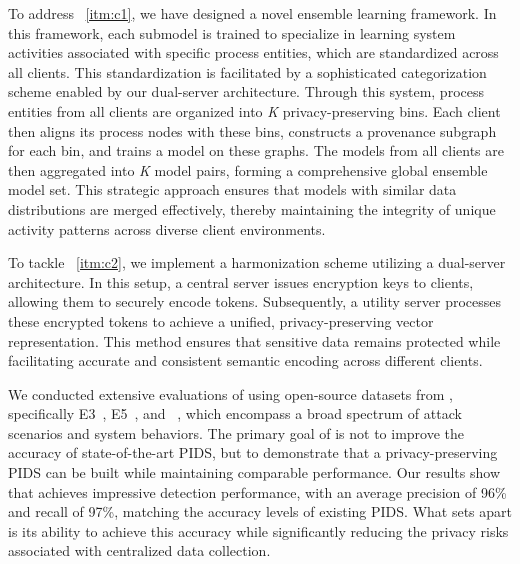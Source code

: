 To address ~\ref{itm:c1}, we have designed a novel ensemble learning framework. In this framework, each submodel is trained to specialize in learning system activities associated with specific process entities, which are standardized across all clients. This standardization is facilitated by a sophisticated categorization scheme enabled by our dual-server architecture. Through this system, process entities from all clients are organized into \textit{K} privacy-preserving bins. Each client then aligns its process nodes with these bins, constructs a provenance subgraph for each bin, and trains a \gnnshort model on these graphs. The models from all clients are then aggregated into \textit{K} model pairs, forming a comprehensive global ensemble model set. This strategic approach ensures that models with similar data distributions are merged effectively, thereby maintaining the integrity of unique activity patterns across diverse client environments.

To tackle ~\ref{itm:c2}, we implement a \wordvec harmonization scheme utilizing a dual-server architecture. In this setup, a central server issues encryption keys to clients, allowing them to securely encode \wordvec tokens. Subsequently, a utility server processes these encrypted tokens to achieve a unified, privacy-preserving vector representation. This method ensures that sensitive data remains protected while facilitating accurate and consistent semantic encoding across different clients.


We conducted extensive evaluations of \Sys using open-source datasets from \darpa, specifically E3~\cite{error3}, E5~\cite{bug5}, and \optc~\cite{anjum2021analyzing}, which encompass a broad spectrum of attack scenarios and system behaviors. The primary goal of \Sys is not to improve the accuracy of state-of-the-art PIDS, but to demonstrate that a privacy-preserving PIDS can be built while maintaining comparable performance. Our results show that \Sys achieves impressive detection performance, with an average precision of 96\% and recall of 97\%, matching the accuracy levels of existing PIDS. What sets \Sys apart is its ability to achieve this accuracy while significantly reducing the privacy risks associated with centralized data collection.

